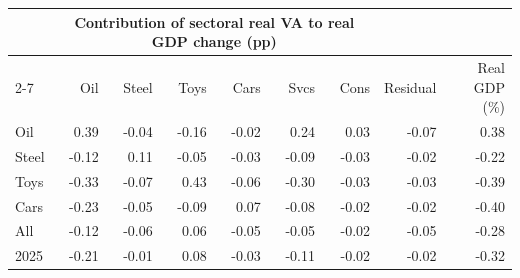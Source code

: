\begin{tabular}{lrrrrrrrr}
\toprule
 & \multicolumn{6}{c}{Contribution of sectoral real VA to real GDP change (pp)} & & \\
\cmidrule(lr){2-7}
 & Oil & Steel & Toys & Cars & Svcs & Cons & Residual & Real GDP (\%) \\
\midrule
Oil & 0.39 & -0.04 & -0.16 & -0.02 & 0.24 & 0.03 & -0.07 & 0.38 \\
Steel & -0.12 & 0.11 & -0.05 & -0.03 & -0.09 & -0.03 & -0.02 & -0.22 \\
Toys & -0.33 & -0.07 & 0.43 & -0.06 & -0.30 & -0.03 & -0.03 & -0.39 \\
Cars & -0.23 & -0.05 & -0.09 & 0.07 & -0.08 & -0.02 & -0.02 & -0.40 \\
All & -0.12 & -0.06 & 0.06 & -0.05 & -0.05 & -0.02 & -0.05 & -0.28 \\
2025 & -0.21 & -0.01 & 0.08 & -0.03 & -0.11 & -0.02 & -0.02 & -0.32 \\
\bottomrule
\end{tabular}
